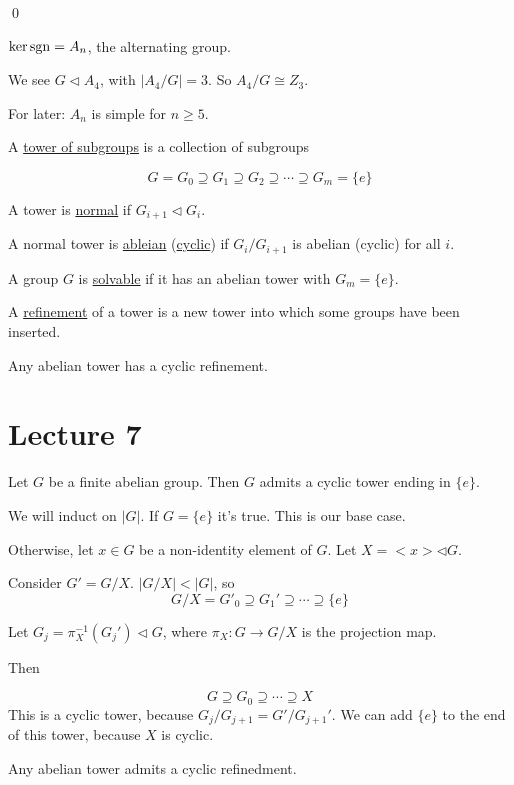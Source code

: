 \documentclass[x11names,reqno,14pt]{extarticle}
\begin{document}
\proof
\qed

$\ker\operatorname{sgn} = A_n$, the alternating group. 

We see $G\lhd A_4$, with $|A_4/G| = 3$. So $A_4/G \cong Z_3$. 

\thm For later: $A_n$ is simple for $n\geq5$. 


A \underline{tower of subgroups} is a collection of subgroups 

\[
G = G_0\supseteq G_1\supseteq G_2 \supseteq \cdots \supseteq G_m = \{e\}
\]

A tower is \underline{normal} if $G_{i + 1}\lhd G_i$. 

A normal tower is \underline{ableian} (\underline{cyclic}) if $G_i/G_{i + 1}$ is abelian (cyclic) for all $i$.

A group $G$ is \underline{solvable} if it has an abelian tower with $G_m = \{e\}$. 

A \underline{refinement} of a tower is a new tower into which some groups have been inserted. 


\prop

Any abelian tower has a cyclic refinement. 

\section*{Lecture 7}

\lem

Let $G$ be a finite abelian group. Then $G$ admits a cyclic tower ending in $\{e\}$. 

\proof

We will induct on $|G|$. If $G = \{e\}$ it's true. This is our base case. 

Otherwise, let $x \in G$ be a non-identity element of $G$. Let $X = <x> \lhd G$.

Consider $G' = G/X$. $|G/X|<|G|$, so 
\[
G/X = G'_0 \supseteq G_1' \supseteq \cdots \supseteq \{e\}
\]

Let $G_j = \pi_X^{-1}(G_j')\lhd G$, where $\pi_X:G\to G/X$ is the projection map. 

Then

\[
G \supseteq G_0 \supseteq \cdots \supseteq X
\]
This is a cyclic tower, because $G_j/G_{j + 1} = G'/G_{j + 1}'$. We can add $\{e\}$ to the end of this tower, because $X$ is cyclic. 

\prop

Any abelian tower admits a cyclic refinedment. 

\proof
\end{document}
